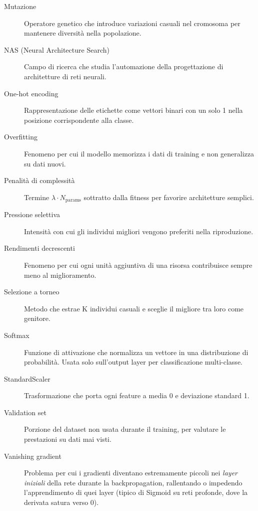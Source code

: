 \documentclass[12pt, a4paper]{article}
\begin{document}
\begin{description}
    \item[Mutazione] Operatore genetico che introduce variazioni casuali nel
        cromosoma per mantenere diversità nella popolazione.

    \item[NAS (Neural Architecture Search)] Campo di ricerca che studia
        l'automazione della progettazione di architetture di reti neurali.

    \item[One-hot encoding] Rappresentazione delle etichette come vettori
        binari con un solo 1 nella posizione corrispondente alla classe.

    \item[Overfitting] Fenomeno per cui il modello memorizza i dati di
        training e non generalizza su dati nuovi.

    \item[Penalità di complessità] Termine $\lambda \cdot N_{\text{params}}$
        sottratto dalla fitness per favorire architetture semplici.

    \item[Pressione selettiva] Intensità con cui gli individui migliori
        vengono preferiti nella riproduzione.

    \item[Rendimenti decrescenti] Fenomeno per cui ogni unità aggiuntiva
        di una risorsa contribuisce sempre meno al miglioramento.

    \item[Selezione a torneo] Metodo che estrae K individui casuali e sceglie
        il migliore tra loro come genitore.

    \item[Softmax] Funzione di attivazione che normalizza un vettore in una
        distribuzione di probabilità. Usata solo sull'output layer per
        classificazione multi-classe.

    \item[StandardScaler] Trasformazione che porta ogni feature a media 0 e
        deviazione standard 1.

    \item[Validation set] Porzione del dataset non usata durante il training,
        per valutare le prestazioni su dati mai visti.

    \item[Vanishing gradient] Problema per cui i gradienti diventano
        estremamente piccoli nei \emph{layer iniziali} della rete durante
        la backpropagation, rallentando o impedendo l'apprendimento di
        quei layer (tipico di Sigmoid su reti profonde, dove la derivata
        satura verso 0).
\end{description}

\end{document}
